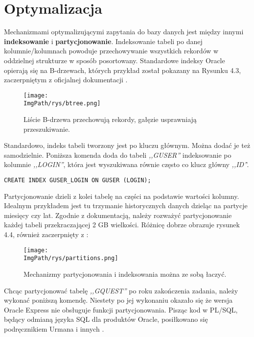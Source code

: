 \documentclass[a4paper,12pt,twoside,openany]{report}
\newcommand{\ImgPath}{.}
\begin{document}
\section{Optymalizacja}
Mechanizmami optymalizującymi zapytania do bazy danych jest między innymi \textbf{indeksowanie} i \textbf{partycjonowanie}. Indeksowanie tabeli po danej kolumnie/kolumnach powoduje przechowywanie wszystkich rekordów w oddzielnej strukturze w sposób posortowany. Standardowe indeksy Oracle opierają się na B-drzewach, których przykład został pokazany na Rysunku 4.3, zaczerpniętym z oficjalnej dokumentacji \cite{Oracle2}.
				\begin{figure}[!htbp]
					\begin{center}
						\centering
						\texttt{[image: \\ImgPath/rys/btree.png]}
					\end{center}
					\caption{Liście B-drzewa przechowują rekordy, gałęzie usprawniają przeszukiwanie.}
					\label{UMLTS}
				\end{figure}
Standardowo, indeks tabeli tworzony jest po kluczu głównym. Można dodać je też samodzielnie. Poniższa komenda doda do tabeli \textit{,,GUSER''} indeksowanie po kolumnie \textit{,,LOGIN''}, która jest wyszukiwana równie często co klucz główny \textit{,,ID'}'.
\begin{lstlisting}
CREATE INDEX GUSER_LOGIN ON GUSER (LOGIN);
\end{lstlisting}
Partycjonowanie dzieli z kolei tabelę na części na podstawie wartości kolumny. Idealnym przykładem jest tu trzymanie historycznych danych  dzieląc na partycje miesięcy czy lat. Zgodnie z dokumentacją, należy rozważyć partycjonowanie każdej tabeli przekraczającej 2 GB wielkości. Różnicę dobrze obrazuje rysunek 4.4, również zaczerpnięty z \cite{Oracle2}:
				\begin{figure}[!htbp]
					\begin{center}
						\centering
						\texttt{[image: \\ImgPath/rys/partitions.png]}
					\end{center}
					\caption{Mechanizmy partycjonowania i indeksowania można ze sobą łaczyć.}
					\label{UMLTS}
				\end{figure}
Chcąc partycjonować tabelę \textit{,,GQUEST''} po roku zakończenia zadania, należy wykonać poniższą komendę. Niestety po jej wykonaniu okazało się że wersja Oracle Express nie obsługuje funkcji partycjonowania. Pisząc kod w PL/SQL, będący odmianą języka SQL dla produktów Oracle, posiłkowano się podręcznikiem Urmana i innych \cite{Oracle}.\\\\
\end{document}
